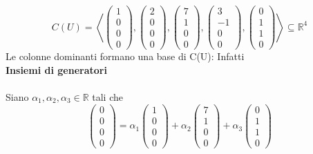 \documentclass[12pt]{article}
\begin{document}
\[C(U)= \left<\begin{pmatrix}
    1\\
    0\\
    0\\
    0
\end{pmatrix}, \begin{pmatrix}
    2\\
    0\\
    0\\
    0
\end{pmatrix}, \begin{pmatrix}
    7\\
    1\\
    0\\
    0
\end{pmatrix}, \begin{pmatrix}
    3\\
    -1\\
    0\\
    0
\end{pmatrix}, \begin{pmatrix}
    0\\
    1\\
    1\\
    0
\end{pmatrix}\right> \subseteq \mathbb{R}^4\]
Le colonne dominanti formano una base di C(U):  Infatti\\
\textbf{Insiemi di generatori}
\\\\
Siano $\alpha_1, \alpha_2, \alpha_3 \in \mathbb{R}$ tali che
\[\begin{pmatrix}
    0\\
    0\\
    0\\
    0
\end{pmatrix} = \alpha_1 \begin{pmatrix}
    1\\
    0\\
    0\\
    0
\end{pmatrix} + \alpha_2 \begin{pmatrix}
    7\\
    1\\
    0\\
    0
\end{pmatrix} + \alpha_3 \begin{pmatrix}
    0\\
    1\\
    1\\
    0
\end{pmatrix}\]
\end{document}
